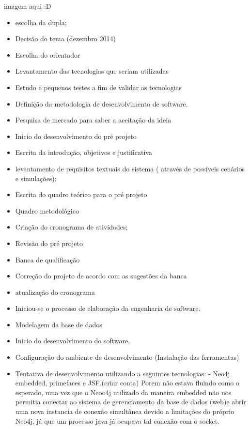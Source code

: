 imagem aqui :D

\par  

 

 






\begin{itemize}
	\item escolha da dupla;
	\item Decisão do tema (dezembro 2014)
	\item Escolha do orientador
	\item Levantamento das tecnologias que seriam utilizadas
	\item Estudo e pequenos testes a fim de validar as tecnologias
	\item Definição da metodologia de desenvolvimento de software.
	\item Pesquisa de mercado para saber a aceitação da ideia
	\item Inicio do desenvolvimento do pré projeto
	\item Escrita da introdução, objetivos e justificativa
	\item levantamento de requisitos textuais do sistema ( através de possíveis cenários e simulações);
	\item Escrita do quadro teórico para o pré projeto 
	\item Quadro metodológico
	\item Criação do cronograma de atividades;
	\item Revisão do pré projeto
	\item Banca de qualificação
	\item Correção do projeto de acordo com as sugestões da banca
	\item atualização do cronograma	
	\item Iniciou-se o processo de elaboração da engenharia de software.
	\item Modelagem da base de dados
	\item Inicio do desenvolvimento do software.	
	\item Configuração do ambiente de desenvolvimento (Instalação das ferramentas)
	\item Tentativa de desenvolvimento utilizando a seguintes tecnologias:
		- Neo4j embedded, primefaces e JSF.(criar conta) Porem não estava fluindo como o esperado, uma vez que o Neoo4j utilizado da maneira embedded não nos permitia conectar ao sistema de gerenciamento da base de dados (web)e abrir uma nova instancia de conexão simultânea devido a limitações do próprio Neo4j, já que um processo java já ocupava tal conexão com o socket.

\end{itemize}
